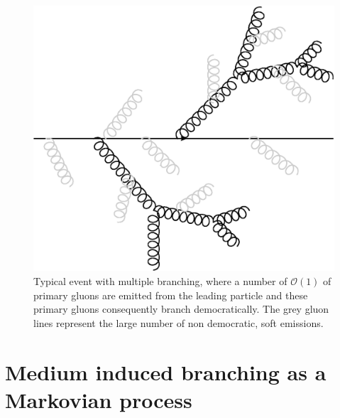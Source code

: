 \documentclass[a4paper,12pt]{article}
\numberwithin{equation}{section}
\begin{document}
\begin{figure}
\begin{center}
\includegraphics[width=0.5\linewidth]{democraticbranch.eps}
\end{center}
\vspace*{-20pt}
\caption{Typical event with multiple branching, where a number of $\mathcal{O}(1)$ of primary gluons are emitted from the leading particle and these primary gluons consequently branch democratically. The grey gluon lines represent the large number of non democratic, soft emissions.}\label{democraticbranch}
\end{figure}







\section{Medium induced branching as a Markovian process}\label{stochastic}


\end{document}
